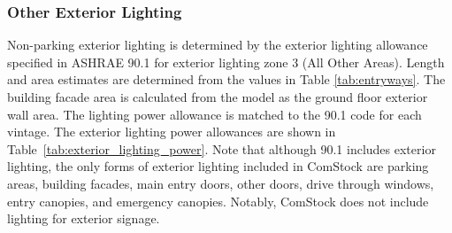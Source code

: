 \subsubsection{Other Exterior Lighting}
Non-parking exterior lighting is determined by the exterior lighting allowance specified in ASHRAE 90.1 for exterior lighting zone 3 (All Other Areas). Length and area estimates are determined from the values in Table \ref{tab:entryways}. The building facade area is calculated from the model as the ground floor exterior wall area. The lighting power allowance is matched to the 90.1 code for each vintage. The exterior lighting power allowances are shown in Table~\ref{tab:exterior_lighting_power}. Note that although 90.1 includes exterior lighting, the only forms of exterior lighting included in ComStock are parking areas, building facades, main entry doors, other doors, drive through windows, entry canopies, and emergency canopies. Notably, ComStock does not include lighting for exterior signage.
